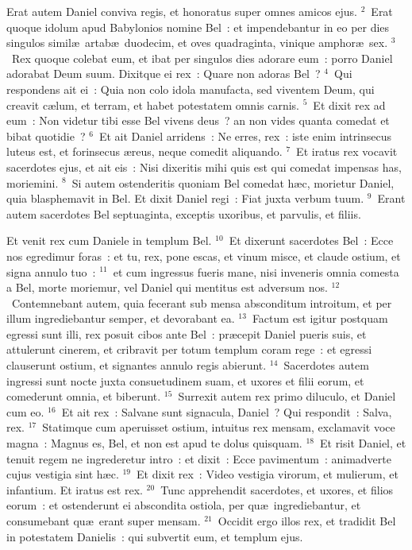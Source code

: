 \bchapter
\lettrine[lines=3,image=true,loversize=0.05,lraise=-0.03]{E}{}rat autem Daniel conviva regis, et honoratus super omnes amicos ejus.
${}^{2}$~Erat quoque idolum apud Babylonios nomine Bel~: et impendebantur in eo per dies singulos simil\ae\ artab\ae\ duodecim, et oves quadraginta, vinique amphor\ae\ sex.
${}^{3}$~Rex quoque colebat eum, et ibat per singulos dies adorare eum~: porro Daniel adorabat Deum suum. Dixitque ei rex~: Quare non adoras Bel~?
${}^{4}$~Qui respondens ait ei~: Quia non colo idola manufacta, sed viventem Deum, qui creavit c\ae lum, et terram, et habet potestatem omnis carnis.
${}^{5}$~Et dixit rex ad eum~: Non videtur tibi esse Bel vivens deus~? an non vides quanta comedat et bibat quotidie~?
${}^{6}$~Et ait Daniel arridens~: Ne erres, rex~: iste enim intrinsecus luteus est, et forinsecus \ae reus, neque comedit aliquando.
${}^{7}$~Et iratus rex vocavit sacerdotes ejus, et ait eis~: Nisi dixeritis mihi quis est qui comedat impensas has, moriemini.
${}^{8}$~Si autem ostenderitis quoniam Bel comedat h\ae c, morietur Daniel, quia blasphemavit in Bel. Et dixit Daniel regi~: Fiat juxta verbum tuum.
${}^{9}$~Erant autem sacerdotes Bel septuaginta, exceptis uxoribus, et parvulis, et filiis.

 Et venit rex cum Daniele in templum Bel.
${}^{10}$~Et dixerunt sacerdotes Bel~: Ecce nos egredimur foras~: et tu, rex, pone escas, et vinum misce, et claude ostium, et signa annulo tuo~:
${}^{11}$~et cum ingressus fueris mane, nisi inveneris omnia comesta a Bel, morte moriemur, vel Daniel qui mentitus est adversum nos.
${}^{12}$~Contemnebant autem, quia fecerant sub mensa absconditum introitum, et per illum ingrediebantur semper, et devorabant ea.
${}^{13}$~Factum est igitur postquam egressi sunt illi, rex posuit cibos ante Bel~: pr\ae cepit Daniel pueris suis, et attulerunt cinerem, et cribravit per totum templum coram rege~: et egressi clauserunt ostium, et signantes annulo regis abierunt.
${}^{14}$~Sacerdotes autem ingressi sunt nocte juxta consuetudinem suam, et uxores et filii eorum, et comederunt omnia, et biberunt.
${}^{15}$~Surrexit autem rex primo diluculo, et Daniel cum eo.
${}^{16}$~Et ait rex~: Salvane sunt signacula, Daniel~? Qui respondit~: Salva, rex.
${}^{17}$~Statimque cum aperuisset ostium, intuitus rex mensam, exclamavit voce magna~: Magnus es, Bel, et non est apud te dolus quisquam.
${}^{18}$~Et risit Daniel, et tenuit regem ne ingrederetur intro~: et dixit~: Ecce pavimentum~: animadverte cujus vestigia sint h\ae c.
${}^{19}$~Et dixit rex~: Video vestigia virorum, et mulierum, et infantium. Et iratus est rex.
${}^{20}$~Tunc apprehendit sacerdotes, et uxores, et filios eorum~: et ostenderunt ei abscondita ostiola, per qu\ae\ ingrediebantur, et consumebant qu\ae\ erant super mensam.
${}^{21}$~Occidit ergo illos rex, et tradidit Bel in potestatem Danielis~: qui subvertit eum, et templum ejus.


